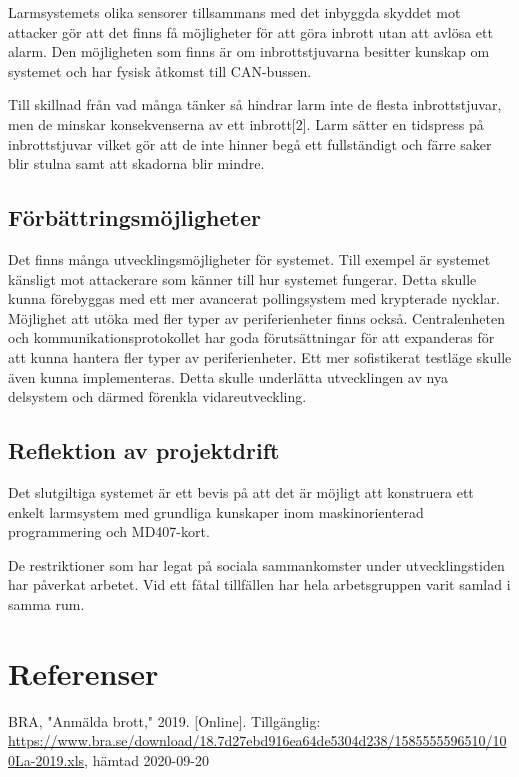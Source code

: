 \documentclass[a4paper]{article}
\newcommand{\todo}[1]{\marginpar{TODO: #1}\vspace{1cm}}
\newcommand{\citewebpage}[6]{\noindent [#1] #2, "#3," #4. [Online]. Tillgänglig: \url{#5},  hämtad #6\\}
\begin{document}
Larmsystemets olika sensorer tillsammans med det inbyggda skyddet mot attacker gör att det finns få möjligheter för att göra inbrott utan att avlösa ett alarm.
Den möjligheten som finns är om inbrottstjuvarna besitter kunskap om systemet och har fysisk åtkomst till CAN-bussen.

Till skillnad från vad många tänker så hindrar larm inte de flesta inbrottstjuvar, men de minskar konsekvenserna av ett inbrott[2]. Larm sätter en tidspress på inbrottstjuvar vilket gör att de inte hinner begå ett fullständigt och färre saker blir stulna samt att skadorna blir mindre.

\subsection{Förbättringsmöjligheter}
Det finns många utvecklingsmöjligheter för systemet.
Till exempel är systemet känsligt mot attackerare som känner till hur systemet fungerar.
Detta skulle kunna förebyggas med ett mer avancerat pollingsystem med krypterade nycklar.
Möjlighet att utöka med fler typer av periferienheter finns också.
Centralenheten och kommunikationsprotokollet har goda förutsättningar för att expanderas för att kunna hantera fler typer av periferienheter.
Ett mer sofistikerat testläge skulle även kunna implementeras.
Detta skulle underlätta utvecklingen av nya delsystem och därmed förenkla vidareutveckling.

\subsection{Reflektion av projektdrift}
Det slutgiltiga systemet är ett bevis på att det är möjligt att konstruera ett enkelt larmsystem med grundliga kunskaper inom maskinorienterad programmering och MD407-kort.

De restriktioner som har legat på sociala sammankomster under utvecklingstiden har påverkat arbetet. Vid ett fåtal tillfällen har hela arbetsgruppen varit samlad i samma rum.


\section{Referenser}
\citewebpage{1}{BRA}{Anmälda brott}{2019}{https://www.bra.se/download/18.7d27ebd916ea64de5304d238/1585555596510/100La-2019.xls}{2020-09-20}
\end{document}
